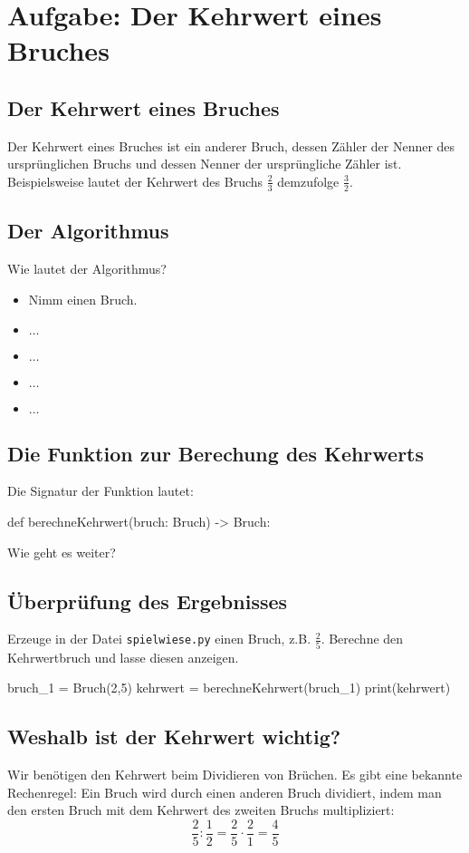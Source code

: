 \section{Aufgabe: Der Kehrwert eines Bruches}

\subsection*{Der Kehrwert eines Bruches}

Der Kehrwert eines Bruches ist ein anderer Bruch, dessen Zähler der Nenner des ursprünglichen Bruchs und dessen Nenner der ursprüngliche Zähler ist. Beispielsweise lautet der Kehrwert des Bruchs $\frac{2}{3}$ demzufolge $\frac{3}{2}$.



\subsection*{Der Algorithmus}

Wie lautet der Algorithmus?
\begin{itemize}
	\item Nimm einen Bruch.
	\item $\dots$
	\item $\dots$
	\item $\dots$
	\item $\dots$
\end{itemize}

\subsection*{Die Funktion zur Berechung des Kehrwerts}

Die Signatur der Funktion lautet:

\begin{codePython}
def berechneKehrwert(bruch: Bruch) -> Bruch:
\end{codePython}

Wie geht es weiter?

\subsection*{Überprüfung des Ergebnisses}

Erzeuge in der Datei \texttt{spielwiese.py} einen Bruch, z.B. $\frac{2}{5}$. Berechne den Kehrwertbruch und lasse diesen anzeigen.

\begin{codePython}
bruch_1 = Bruch(2,5)
kehrwert = berechneKehrwert(bruch_1)
print(kehrwert)
\end{codePython}

\subsection*{Weshalb ist der Kehrwert wichtig?}

Wir benötigen den Kehrwert beim Dividieren von Brüchen. Es gibt eine bekannte Rechenregel: Ein Bruch wird durch einen anderen Bruch dividiert, indem man den ersten Bruch mit dem Kehrwert des zweiten Bruchs multipliziert:
\[
\frac{2}{5} : \frac{1}{2} = \frac{2}{5} \cdot \frac{2}{1} = \frac{4}{5}
\]

